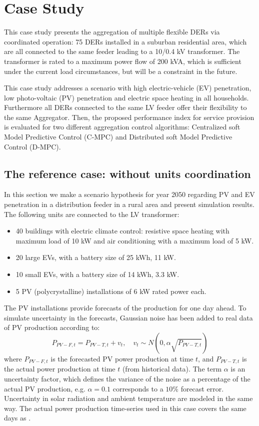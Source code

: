 \section{Case Study}
\label{sec:case}
This case study presents the aggregation of multiple flexible DERs via coordinated operation: 75 DERs installed in a suburban residential area, which are all connected to the same feeder leading to a 10/0.4 kV transformer. The transformer is rated to a maximum power flow of 200 kVA, which is sufficient under the current load circumstances, but will be a constraint in the future.

This case study addresses a scenario with high electric-vehicle (EV) penetration, low photo-voltaic (PV) penetration and electric space heating in all households. Furthermore all DERs connected to the same LV feeder offer their flexibility to the same Aggregator. Then, the proposed performance index for service provision is evaluated for two different aggregation control algorithms: Centralized soft Model Predictive Control (C-MPC) and Distributed soft Model Predictive Control (D-MPC).

\subsection{The reference case: without units coordination}
In this section we make a scenario hypothesis for year 2050 regarding PV and EV penetration in a distribution feeder in a rural area and present simulation results. The following units are connected to the LV transformer:
\begin{itemize}
\item 40 buildings with electric climate control: resistive space heating with maximum load of 10 kW and air conditioning with a maximum load of 5 kW.
\item 20 large EVs, with a battery size of 25 kWh, 11 kW.
\item 10 small EVs, with a battery size of 14 kWh, 3.3 kW.
\item 5 PV (polycrystalline) installations of 6 kW rated power each.
\end{itemize} 

The PV installations provide forecasts of the production for one day ahead. To simulate uncertainty in the forecasts, Gaussian noise has been added to real data of PV production according to:
\begin{equation}
	{P_{PV-F,t}} = {P_{PV-T,t}} + {v_t},\quad {v_t} \sim N\left( {0,\alpha  \sqrt {{P_{PV-T,t}}} } \right)\label{eq:pvprod}
\end{equation}
where $P_{PV-F,t}$ is the forecasted PV power production at time $t$, and $P_{PV-T,t}$ is the actual power production at time $t$ (from historical data). The term $\alpha$ is an uncertainty factor, which defines the variance of the noise as a percentage of the actual PV production, e.g. $\alpha = 0.1$ corresponds to a $10\%$ forecast error. Uncertainty in solar radiation and ambient temperature are modeled in the same way. The actual power production time-series used in this case covers the same days as \cite{costanzo2013coordination}.


